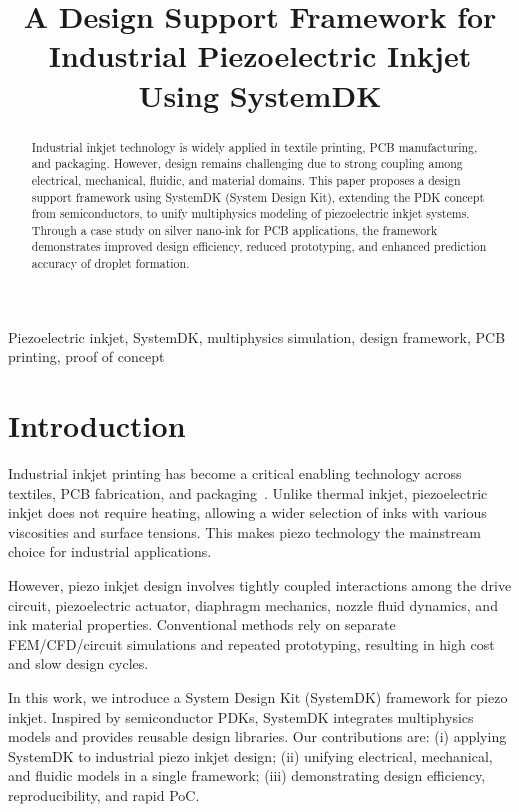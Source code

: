 \documentclass[conference]{IEEEtran}
\title{A Design Support Framework for Industrial Piezoelectric Inkjet Using SystemDK}
\author{%
  \IEEEauthorblockN{Shinichi Samizo}
  \IEEEauthorblockA{Independent Semiconductor Researcher\\
  Former Engineer at Seiko Epson Corporation\\
  Email: \href{mailto:shin3t72@gmail.com}{shin3t72@gmail.com}\\
  GitHub: \url{https://github.com/Samizo-AITL}}%
}
\begin{document}
\maketitle

\begin{abstract}
Industrial inkjet technology is widely applied in textile printing, PCB manufacturing, and packaging. However, design remains challenging due to strong coupling among electrical, mechanical, fluidic, and material domains. This paper proposes a design support framework using SystemDK (System Design Kit), extending the PDK concept from semiconductors, to unify multiphysics modeling of piezoelectric inkjet systems. Through a case study on silver nano-ink for PCB applications, the framework demonstrates improved design efficiency, reduced prototyping, and enhanced prediction accuracy of droplet formation.
\end{abstract}

\begin{IEEEkeywords}
Piezoelectric inkjet, SystemDK, multiphysics simulation, design framework, PCB printing, proof of concept
\end{IEEEkeywords}

\section{Introduction}
Industrial inkjet printing has become a critical enabling technology across textiles, PCB fabrication, and packaging~\cite{derby2010,calvert2001}. Unlike thermal inkjet, piezoelectric inkjet does not require heating, allowing a wider selection of inks with various viscosities and surface tensions. This makes piezo technology the mainstream choice for industrial applications.

However, piezo inkjet design involves tightly coupled interactions among the drive circuit, piezoelectric actuator, diaphragm mechanics, nozzle fluid dynamics, and ink material properties. Conventional methods rely on separate FEM/CFD/circuit simulations and repeated prototyping, resulting in high cost and slow design cycles.

In this work, we introduce a System Design Kit (SystemDK) framework for piezo inkjet. Inspired by semiconductor PDKs, SystemDK integrates multiphysics models and provides reusable design libraries. Our contributions are: (i) applying SystemDK to industrial piezo inkjet design; (ii) unifying electrical, mechanical, and fluidic models in a single framework; (iii) demonstrating design efficiency, reproducibility, and rapid PoC.
\end{document}
